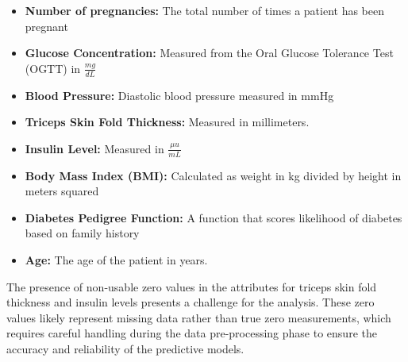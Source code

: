 \documentclass[journal]{IEEEtran}
\begin{document}
\begin{itemize}
    \item \textbf{Number of pregnancies:} The total number of times a patient has been pregnant
    \item \textbf{Glucose Concentration:} Measured from the Oral Glucose Tolerance Test (OGTT) in $\frac{mg}{dL}$
    \item \textbf{Blood Pressure:} Diastolic blood pressure measured in mmHg
    \item \textbf{Triceps Skin Fold Thickness:} Measured in millimeters.
    \item \textbf{Insulin Level:} Measured in $\frac{\mu u}{mL}$ 
    \item \textbf{Body Mass Index (BMI):}  Calculated as weight in kg divided by height in meters squared
    \item \textbf{Diabetes Pedigree Function:} A function that scores likelihood of diabetes based on family history
    \item \textbf{Age:} The age of the patient in years.
\end{itemize}

The presence of non-usable zero values in the attributes for triceps skin fold thickness and insulin levels presents a challenge for the analysis. These zero values likely represent missing data rather than true zero measurements, which requires careful handling during the data pre-processing phase to ensure the accuracy and reliability of the predictive models.
\end{document}
